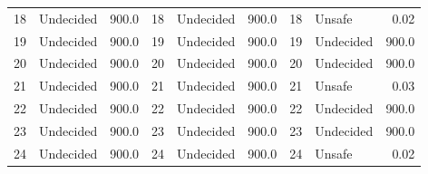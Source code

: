 \begin{table}[!ht]
\begin{tabular}{|llr|llr|llr|}
    18 & Undecided & 900.0 &    18 & Undecided & 900.0 &    18 & Unsafe & 0.02\\ 
    19 & Undecided & 900.0 &    19 & Undecided & 900.0 &    19 & Undecided & 900.0\\ 
    20 & Undecided & 900.0 &    20 & Undecided & 900.0 &    20 & Undecided & 900.0\\ 
    21 & Undecided & 900.0 &    21 & Undecided & 900.0 &    21 & Unsafe & 0.03\\ 
    22 & Undecided & 900.0 &    22 & Undecided & 900.0 &    22 & Undecided & 900.0\\ 
    23 & Undecided & 900.0 &    23 & Undecided & 900.0 &    23 & Undecided & 900.0\\ 
    24 & Undecided & 900.0 &    24 & Undecided & 900.0 &    24 & Unsafe & 0.02\\ 
    \bottomrule
  \end{tabular}
\end{table}

